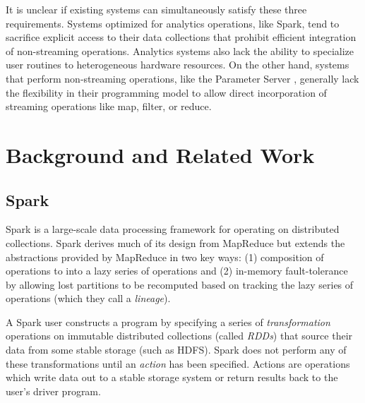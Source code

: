 \documentclass[tog]{acmsiggraph}
\begin{document}
It is unclear if existing systems can simultaneously satisfy these three
requirements. Systems optimized for analytics operations, like Spark, tend to
sacrifice explicit access to their data collections that prohibit efficient
integration of non-streaming operations. Analytics systems also lack the
ability to specialize user routines to heterogeneous hardware resources. On the
other hand, systems that perform non-streaming operations, like the Parameter
Server \cite{li2014scaling}, generally lack the flexibility in their
programming model to allow direct incorporation of streaming operations like
map, filter, or reduce.

\section{Background and Related Work}

\subsection{Spark}
Spark \cite{zaharia2012resilient} is a large-scale data processing framework
for operating on distributed collections. Spark derives much of its design from
MapReduce \cite{dean2008mapreduce} but extends the abstractions provided by
MapReduce in two key ways: (1) composition of operations to into a lazy series
of operations and (2) in-memory fault-tolerance by allowing lost partitions to
be recomputed based on tracking the lazy series of operations (which they call
a \textit{lineage}).

A Spark user constructs a program by specifying a series of
\textit{transformation} operations on immutable distributed collections (called
\textit{RDDs}) that source their data from some stable storage (such as
HDFS). Spark does not perform any of these transformations until an
\textit{action} has been specified. Actions are operations which write data out
to a stable storage system or return results back to the user's driver
program.

\end{document}

